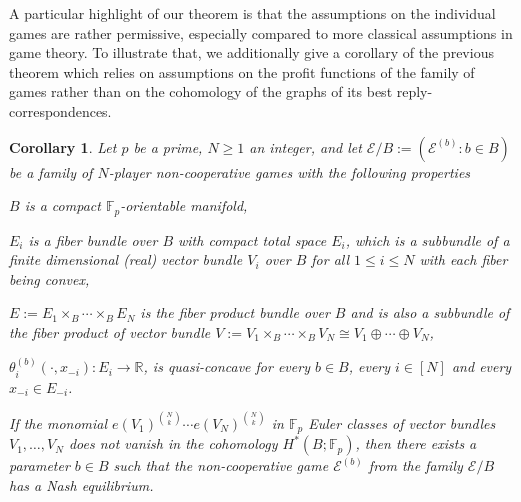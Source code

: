 \documentclass[a4paper,11pt,reqno,english]{amsart}
\theoremstyle{plain}
\newtheorem{corollary}[theorem]{Corollary}
\theoremstyle{definition}
\newcommand{\Ecal}{\mathcal{E}}
\begin{document}
\medskip
A particular highlight of our theorem is that the assumptions on the individual games are rather permissive, especially compared to more classical assumptions in game theory. To illustrate that, we additionally give a corollary of the previous theorem which relies on assumptions on the profit functions of the family of games rather than on the cohomology of the graphs of its best reply-correspondences.



\begin{corollary}\label{cor:MainResultMultilateralCorollay}
	Let $p$ be a prime, $N\geq 1$ an integer, and let $\Ecal/B:=(\Ecal^{(b)}:b\in B)$ be a family of $N$-player non-cooperative games with the following properties
	\begin{compactitem}[\quad --]
		\item $B$ is a compact $\mathbb{F}_p$-orientable manifold,
		\item $E_i$ is a fiber bundle over $B$ with compact total space $E_i$, which is a subbundle of a finite dimensional (real) vector bundle $V_i$ over $B$ for all $1\leq i\leq N$ with each fiber being convex,
		\item $E:=E_1\times_B\cdots \times_BE_N$ is the fiber product bundle over $B$ and is also a subbundle of the fiber product of vector bundle $V:= V_1\times_B\cdots\times_B V_N\cong V_1\oplus\cdots\oplus V_N$,
		\item $\theta_i^{(b)}(\cdot, x_{-i})\colon E_i\longrightarrow\mathbb{R}$, is quasi-concave for every $b\in B$, every $i\in [N]$ and every $x_{-i}\in E_{-i}$.
	\end{compactitem}

	\smallskip\noindent
	If the monomial $e(V_1)^{\binom{N}{k}}\cdots e(V_N)^{\binom{N}{k}}$ in $\mathbb{F}_p$ Euler classes of vector bundles $V_1,\dots, V_N$ does not vanish in the cohomology $H^*(B;\mathbb{F}_p)$, then there exists a parameter $b\in B$ such that the non-cooperative game $\Ecal^{(b)}$ from the family $\Ecal/B$ has a Nash equilibrium.
\end{corollary}
\end{document}
